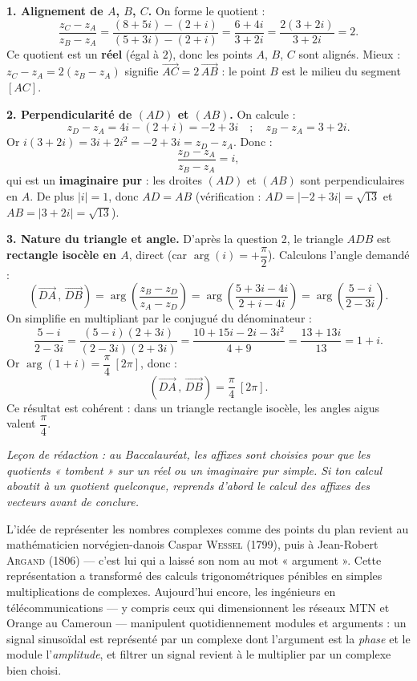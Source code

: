 \documentclass[11pt]{article}
\begin{document}
\begin{corrige}
\textbf{1. Alignement de $A$, $B$, $C$.} On forme le quotient :
\[ \dfrac{z_C - z_A}{z_B - z_A} = \dfrac{(8 + 5i) - (2 + i)}{(5 + 3i) - (2 + i)} = \dfrac{6 + 4i}{3 + 2i} = \dfrac{2(3 + 2i)}{3 + 2i} = 2. \]
Ce quotient est un \textbf{réel} (égal à $2$), donc les points $A$, $B$, $C$ sont alignés. Mieux : $z_C - z_A = 2(z_B - z_A)$ signifie $\overrightarrow{AC} = 2\,\overrightarrow{AB}$ : le point $B$ est le milieu du segment $[AC]$.

\textbf{2. Perpendicularité de $(AD)$ et $(AB)$.} On calcule :
\[ z_D - z_A = 4i - (2 + i) = -2 + 3i \quad ; \quad z_B - z_A = 3 + 2i. \]
Or $i(3 + 2i) = 3i + 2i^2 = -2 + 3i = z_D - z_A$. Donc :
\[ \dfrac{z_D - z_A}{z_B - z_A} = i, \]
qui est un \textbf{imaginaire pur} : les droites $(AD)$ et $(AB)$ sont perpendiculaires en $A$. De plus $|i| = 1$, donc $AD = AB$ (vérification : $AD = |-2 + 3i| = \sqrt{13}$ et $AB = |3 + 2i| = \sqrt{13}$).

\textbf{3. Nature du triangle et angle.} D'après la question 2, le triangle $ADB$ est \textbf{rectangle isocèle en $A$}, direct (car $\arg(i) = +\dfrac{\pi}{2}$). Calculons l'angle demandé :
\[ \left(\overrightarrow{DA}\,,\,\overrightarrow{DB}\right) = \arg\left(\dfrac{z_B - z_D}{z_A - z_D}\right) = \arg\left(\dfrac{5 + 3i - 4i}{2 + i - 4i}\right) = \arg\left(\dfrac{5 - i}{2 - 3i}\right). \]
On simplifie en multipliant par le conjugué du dénominateur :
\[ \dfrac{5 - i}{2 - 3i} = \dfrac{(5 - i)(2 + 3i)}{(2 - 3i)(2 + 3i)} = \dfrac{10 + 15i - 2i - 3i^2}{4 + 9} = \dfrac{13 + 13i}{13} = 1 + i. \]
Or $\arg(1 + i) = \dfrac{\pi}{4} \ [2\pi]$, donc :
\[ \left(\overrightarrow{DA}\,,\,\overrightarrow{DB}\right) = \dfrac{\pi}{4} \ [2\pi]. \]
Ce résultat est cohérent : dans un triangle rectangle isocèle, les angles aigus valent $\dfrac{\pi}{4}$.

\emph{Leçon de rédaction : au Baccalauréat, les affixes sont choisies pour que les quotients « tombent » sur un réel ou un imaginaire pur simple. Si ton calcul aboutit à un quotient quelconque, reprends d'abord le calcul des affixes des vecteurs avant de conclure.}
\end{corrige}

\begin{savaistu}
L'idée de représenter les nombres complexes comme des points du plan revient au mathématicien norvégien-danois Caspar \textsc{Wessel} (1799), puis à Jean-Robert \textsc{Argand} (1806) — c'est lui qui a laissé son nom au mot « argument ». Cette représentation a transformé des calculs trigonométriques pénibles en simples multiplications de complexes. Aujourd'hui encore, les ingénieurs en télécommunications — y compris ceux qui dimensionnent les réseaux MTN et Orange au Cameroun — manipulent quotidiennement modules et arguments : un signal sinusoïdal est représenté par un complexe dont l'argument est la \emph{phase} et le module l'\emph{amplitude}, et filtrer un signal revient à le multiplier par un complexe bien choisi.
\end{savaistu}
\end{document}
